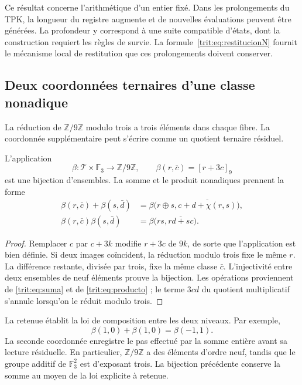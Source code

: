 Ce résultat concerne l'arithmétique d'un entier fixé. Dans les
prolongements du TPK, la longueur du registre augmente et de
nouvelles évaluations peuvent être générées. La profondeur y correspond à une suite
compatible d'états, dont la construction requiert les règles de
survie. La formule~\eqref{trit:eq:restitucionN} fournit le mécanisme
local de restitution que ces prolongements doivent conserver.

\subsection{Deux coordonnées ternaires d'une classe nonadique}
\label{trit:nonadico}

La réduction de \(\mathbb Z/9\mathbb Z\) modulo trois a trois éléments
dans chaque fibre. La coordonnée supplémentaire peut s'écrire comme un quotient
ternaire résiduel.

\begin{proposicion}
\label{trit:prop:beta}
L'application
\[
 \beta:\mathcal T\times\mathbb F_3\longrightarrow\mathbb Z/9\mathbb Z,
 \qquad \beta(r,\bar c)=[r+3c]_9
\]
est une bijection d'ensembles. La somme et le produit nonadiques prennent la
forme
\begin{align}
 \beta(r,\bar c)+\beta(s,\bar d)
 &=\beta\bigl(r\oplus s,\overline{c+d+\chi(r,s)}\bigr),
 \label{trit:eq:beta-suma}\\
 \beta(r,\bar c)\beta(s,\bar d)
 &=\beta\bigl(rs,\overline{rd+sc}\bigr).
 \label{trit:eq:beta-producto}
\end{align}
\end{proposicion}
\begin{proof}
Remplacer \(c\) par \(c+3k\) modifie \(r+3c\) de \(9k\), de sorte que
l'application est bien définie. Si deux images coïncident, la réduction
modulo trois fixe le même \(r\). La différence restante, divisée par
trois, fixe la même classe \(\bar c\). L'injectivité entre deux ensembles
de neuf éléments prouve la bijection. Les opérations proviennent de
\eqref{trit:eq:suma} et de \eqref{trit:eq:producto} ; le terme \(3cd\) du
quotient multiplicatif s'annule lorsqu'on le réduit modulo trois.
\end{proof}

La retenue établit la loi de composition entre les deux niveaux. Par
exemple,
\[
 \beta(1,0)+\beta(1,0)=\beta(-1,1).
\]
La seconde coordonnée enregistre le pas effectué par la somme entière avant
sa lecture résiduelle. En particulier, \(\mathbb Z/9\mathbb Z\) a des
éléments d'ordre neuf, tandis que le groupe additif de
\(\mathbb F_3^2\) est d'exposant trois. La bijection précédente conserve
la somme au moyen de la loi explicite à retenue.

